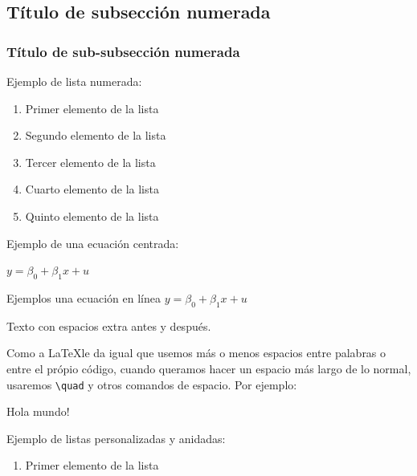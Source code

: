 \documentclass[10pt, a4paper, landscape]{article}
\begin{document}
\begin{multicols}{3}
		\subsection{Título de subsección numerada}

        \subsubsection{Título de sub-subsección numerada}
        
        Ejemplo de lista numerada:
        
		\begin{enumerate}[leftmargin=*]
			\item Primer elemento de la lista
			\item Segundo elemento de la lista
            \item Tercer elemento de la lista
            \item Cuarto elemento de la lista
            \item Quinto elemento de la lista
		\end{enumerate}
        
        Ejemplo de una ecuación centrada:
                
		\begin{center}
			$y = \beta_{0} + \beta_{1} x + u$
		\end{center}
			
		Ejemplos una ecuación en línea $y = \beta_{0} + \beta_{1} x + u$

        \vspace*{1cm}
        
        Texto con espacios extra antes y después.
        
        \vspace*{1cm}

        Como   a       \LaTeX le da igual que   usemos más  o menos   espacios entre palabras o      entre el própio código,  cuando queramos    hacer un       espacio   más largo        de lo normal, usaremos \verb|\quad| y otros comandos de espacio. Por ejemplo:

        Hola \quad mundo! 
        
	\columnbreak
        
        Ejemplo de listas personalizadas y anidadas:
        
		\begin{enumerate}[leftmargin=*, label=\alph{*})]
			\item Primer elemento de la lista
			

\end{enumerate}
\end{multicols}
\end{document}
